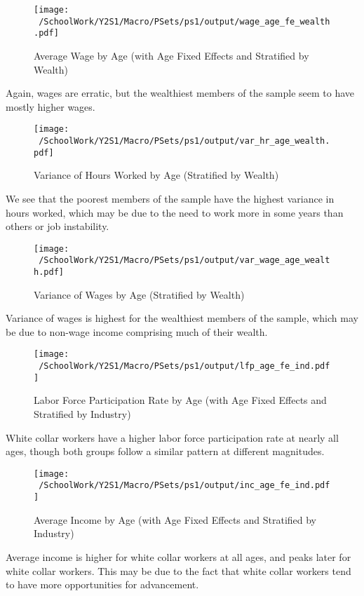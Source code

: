 \documentclass[12pt]{article}
\begin{document}
\begin{figure}[h!]
    \centering
    \texttt{[image: ~/SchoolWork/Y2S1/Macro/PSets/ps1/output/wage\_age\_fe\_wealth.pdf]}
    \caption{Average Wage by Age (with Age Fixed Effects and Stratified by Wealth)}
\end{figure}

Again, wages are erratic, but the wealthiest members of the sample seem to have mostly higher wages.

\begin{figure}[h!]
    \centering
    \texttt{[image: ~/SchoolWork/Y2S1/Macro/PSets/ps1/output/var\_hr\_age\_wealth.pdf]}
    \caption{Variance of Hours Worked by Age (Stratified by Wealth)}
\end{figure} 

We see that the poorest members of the sample have the highest variance in hours worked, which may be due
to the need to work more in some years than others or job instability.

\begin{figure}[h!]
    \centering
    \texttt{[image: ~/SchoolWork/Y2S1/Macro/PSets/ps1/output/var\_wage\_age\_wealth.pdf]}
    \caption{Variance of Wages by Age (Stratified by Wealth)}
\end{figure} 

Variance of wages is highest for the wealthiest members of the sample, which may be due to non-wage income comprising much of their wealth.

\begin{figure}[h!]
    \centering
    \texttt{[image: ~/SchoolWork/Y2S1/Macro/PSets/ps1/output/lfp\_age\_fe\_ind.pdf]}
    \caption{Labor Force Participation Rate by Age (with Age Fixed Effects and Stratified by Industry)}
\end{figure}

White collar workers have a higher labor force participation rate at nearly all ages, though both groups
follow a similar pattern at different magnitudes.

\begin{figure}[h!]
    \centering
    \texttt{[image: ~/SchoolWork/Y2S1/Macro/PSets/ps1/output/inc\_age\_fe\_ind.pdf]}
    \caption{Average Income by Age (with Age Fixed Effects and Stratified by Industry)}
\end{figure}

Average income is higher for white collar workers at all ages, and peaks later for white collar workers.
This may be due to the fact that white collar workers tend to have more opportunities for advancement.
\end{document}
